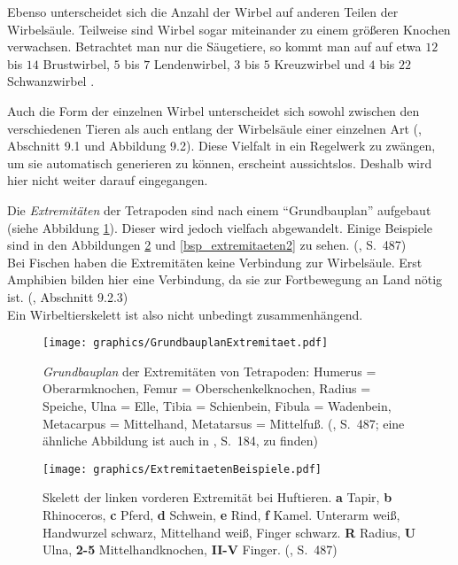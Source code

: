Ebenso unterscheidet sich die Anzahl der Wirbel auf anderen Teilen der Wirbelsäule. Teilweise sind Wirbel sogar miteinander zu einem größeren Knochen verwachsen. Betrachtet man nur die Säugetiere, so kommt man auf auf etwa $12$ bis $14$ Brustwirbel, $5$ bis $7$ Lendenwirbel, $3$ bis $5$ Kreuzwirbel und $4$ bis $22$ Schwanzwirbel \cite{AnatomieKuenstler}.

Auch die Form der einzelnen Wirbel unterscheidet sich sowohl zwischen den verschiedenen Tieren als auch entlang der Wirbelsäule einer einzelnen Art (\cite{Vergleichende_Anatomie}, Abschnitt 9.1 und Abbildung 9.2). Diese Vielfalt in ein Regelwerk zu zwängen, um sie automatisch generieren zu können, erscheint aussichtslos. Deshalb wird hier nicht weiter darauf eingegangen.

Die \emph{Extremitäten} der Tetrapoden sind nach einem "`Grundbauplan"' aufgebaut (siehe Abbildung \ref{grundbauplan}). Dieser wird jedoch vielfach abgewandelt. Einige Beispiele sind in den Abbildungen \ref{bsp_extremitaeten1} und \ref{bsp_extremitaeten2} zu sehen. (\cite{AllgemeineZoologie}, S.\ 487)\\
Bei Fischen haben die Extremitäten keine Verbindung zur Wirbelsäule. Erst Amphibien bilden hier eine Verbindung, da sie zur Fortbewegung an Land nötig ist. (\cite{Vergleichende_Anatomie}, Abschnitt 9.2.3)\\
Ein Wirbeltierskelett ist also nicht unbedingt zusammenhängend.

\begin{figure}
 \centering
 \texttt{[image: graphics/GrundbauplanExtremitaet.pdf]}
 \caption{\emph{Grundbauplan} der Extremitäten von Tetrapoden: Humerus = Oberarmknochen, Femur = Oberschenkelknochen, Radius = Speiche, Ulna = Elle, Tibia = Schienbein, Fibula = Wadenbein, Metacarpus = Mittelhand, Metatarsus = Mittelfuß. (\cite{AllgemeineZoologie}, S.\ 487; eine ähnliche Abbildung ist auch in \cite{Vergleichende_Anatomie}, S.\ 184, zu finden)}
 \label{grundbauplan}
\end{figure}

\begin{figure}
 \centering
 \texttt{[image: graphics/ExtremitaetenBeispiele.pdf]}
 \caption{Skelett der linken vorderen Extremität bei Huftieren. \textbf{a} Tapir, \textbf{b} Rhinoceros, \textbf{c} Pferd, \textbf{d} Schwein, \textbf{e} Rind, \textbf{f} Kamel. Unterarm weiß, Handwurzel schwarz, Mittelhand weiß, Finger schwarz. \textbf{R} Radius, \textbf{U} Ulna, \textbf{2-5} Mittelhandknochen, \textbf{II-V} Finger. (\cite{AllgemeineZoologie}, S.\ 487)}
 \label{bsp_extremitaeten1}
\end{figure}

